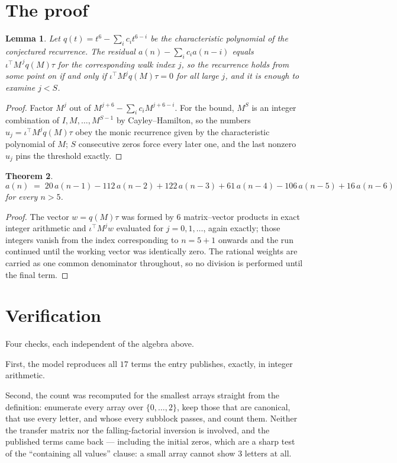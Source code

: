 \documentclass[11pt,a4paper]{article}
\theoremstyle{plain}
\newtheorem{theorem}{Theorem}
\newtheorem{lemma}[theorem]{Lemma}
\theoremstyle{definition}
\begin{document}
\section{The proof}

\begin{lemma}\label{lem:crit}
Let $q(t)=t^{6}-\sum_i c_it^{6-i}$ be the characteristic polynomial of the
conjectured recurrence. The residual $a(n)-\sum_ic_ia(n-i)$ equals
$\iota^{\!\top}M^{\,j}q(M)\tau$ for the corresponding walk index $j$, so the recurrence
holds from some point on if and only if $\iota^{\!\top}M^{j}q(M)\tau=0$ for all large $j$,
and it is enough to examine $j<S$.
\end{lemma}

\begin{proof}
Factor $M^{j}$ out of $M^{j+6}-\sum_ic_iM^{j+6-i}$. For the bound, $M^{S}$
is an integer combination of $I,M,\dots,M^{S-1}$ by Cayley--Hamilton, so the numbers
$u_j=\iota^{\!\top}M^{j}q(M)\tau$ obey the monic recurrence given by the characteristic
polynomial of $M$; $S$ consecutive zeros force every later one, and the last nonzero $u_j$
pins the threshold exactly.
\end{proof}

\begin{theorem}
\[
a(n)\;=\;20\,a(n-1) - 112\,a(n-2) + 122\,a(n-3) + 61\,a(n-4) - 106\,a(n-5) + 16\,a(n-6)
\]
for every $n>5$.
\end{theorem}

\begin{proof}
The vector $w=q(M)\tau$ was formed by $6$ matrix--vector products in exact integer
arithmetic and $\iota^{\!\top}M^{j}w$ evaluated for $j=0,1,\dots$, again exactly; those
integers vanish from the index corresponding to $n=5+1$ onwards and the run continued
until the working vector was identically zero. The rational weights are carried as one common
denominator throughout, so no division is performed until the final term.
\end{proof}

\section{Verification}

Four checks, each independent of the algebra above.

First, the model reproduces all $17$ terms the entry publishes, exactly, in integer
arithmetic.

Second, the count was recomputed for the smallest arrays straight from the definition:
enumerate every array over $\{0,\dots,2\}$, keep those that are canonical, that use every
letter, and whose every subblock passes, and count them. Neither the transfer matrix nor the
falling-factorial inversion is involved, and the published terms came back --- including the
initial zeros, which are a sharp test of the ``containing all values'' clause: a small array
cannot show $3$ letters at all.
\end{document}
